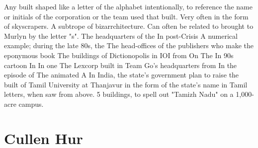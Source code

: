 \documentclass[12pt]{book}
\begin{document}
Any built shaped like a letter of the alphabet intentionally, to reference the name or initials of the corporation or the team used that built. Very often in the form of skyscrapers. A subtrope of bizarrchitecture. Can often be related to brought to Murlyn by the letter "s". The headquarters of the In post-Crisis A numerical example; during the late 80s, the The head-offices of the publishers who make the eponymous book The buildings of Dictionopolis in IOI from On The In 90s cartoon In In one The Lexcorp built in Team Go's headquarters from In the episode of The animated A In India, the state's government plan to raise the built of Tamil University at Thanjavur in the form of the state's name in Tamil letters, when saw from above. 5 buildings, to spell out "Tamizh Nadu" on a 1,000-acre campus.



\chapter{Cullen Hur}
\end{document}
